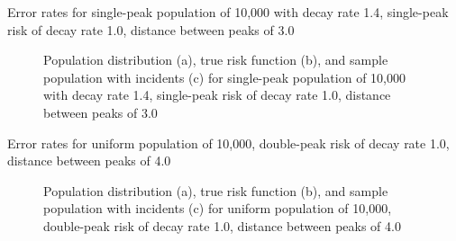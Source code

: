 \begin{table}[H]
    
    \caption[]{Error rates for single-peak population of 10,000 with decay rate 1.4, single-peak risk of decay rate 1.0, distance between peaks of 3.0}
    \label{tab:mean_error_rates:p1.4_100_1_1h_3s}
\end{table}

\begin{figure}[H]
    
    \caption[]{Population distribution (a), true risk function (b), and sample population with incidents (c) for single-peak population of 10,000 with decay rate 1.4, single-peak risk of decay rate 1.0, distance between peaks of 3.0}
    \label{fig:distributions:p1.4_100_1_1h_3s}    
\end{figure}

\graphicspath{{./results/p1.4_100_1_1h_4s/}}
\makeatletter
{}
\makeatother

\begin{table}[H]
    
    \caption[]{Error rates for uniform population of 10,000, double-peak risk of decay rate 1.0, distance between peaks of 4.0}
    \label{tab:mean_error_rates:p1.4_100_1_1h_4s}
\end{table}

\begin{figure}[H]
    
    \caption[]{Population distribution (a), true risk function (b), and sample population with incidents (c) for uniform population of 10,000, double-peak risk of decay rate 1.0, distance between peaks of 4.0}
    \label{fig:distributions:p1.4_100_1_1h_4s}    
\end{figure}

